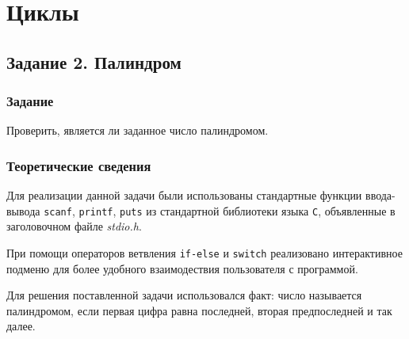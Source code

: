 \documentclass[12pt,a4paper]{report}
\begin{document}
\newpage



\chapter{Циклы}
\section{Задание 2. Палиндром}
\subsection{Задание}

\hspace{\parindent}Проверить, является ли заданное число палиндромом.

\subsection{Теоретические сведения}
\hspace{\parindent}Для реализации данной задачи были использованы стандартные функции ввода-вывода \texttt{scanf}, \texttt{printf}, \texttt{puts} из стандартной библиотеки языка \verb+С+, объявленные в заголовочном файле \textit{stdio.h}.

При помощи операторов ветвления \texttt{if-else} и \texttt{switch} реализовано интерактивное подменю для более удобного взаимодествия пользователя с программой.

Для решения поставленной задачи использовался факт: число называется палиндромом, если первая цифра равна последней, вторая предпоследней и так далее.
\end{document}
